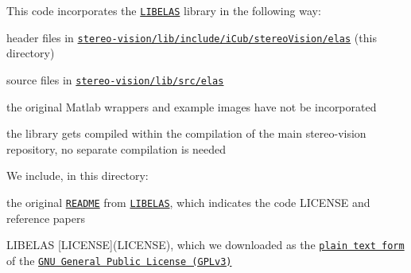 This code incorporates the \href{http://www.cvlibs.net/software/libelas/}{\tt L\+I\+B\+E\+L\+AS} library in the following way\+:
\begin{DoxyItemize}
\item header files in \href{./}{\tt stereo-\/vision/lib/include/i\+Cub/stereo\+Vision/elas} (this directory)
\item source files in \href{../../../../src/elas}{\tt stereo-\/vision/lib/src/elas}
\item the original Matlab wrappers and example images have not be incorporated
\item the library gets compiled within the compilation of the main {\ttfamily stereo-\/vision} repository, no separate compilation is needed
\end{DoxyItemize}

We include, in this directory\+:
\begin{DoxyItemize}
\item the original \href{LIBELAS-README.txt}{\tt R\+E\+A\+D\+ME} from \href{http://www.cvlibs.net/software/libelas/}{\tt L\+I\+B\+E\+L\+AS}, which indicates the code L\+I\+C\+E\+N\+SE and reference papers
\item L\+I\+B\+E\+L\+AS \mbox{[}L\+I\+C\+E\+N\+SE\mbox{]}(L\+I\+C\+E\+N\+SE), which we downloaded as the \href{http://www.gnu.org/licenses/gpl-3.0.txt}{\tt plain text form} of the \href{http://www.gnu.org/licenses/gpl.html}{\tt G\+NU General Public License (G\+P\+Lv3)} 
\end{DoxyItemize}